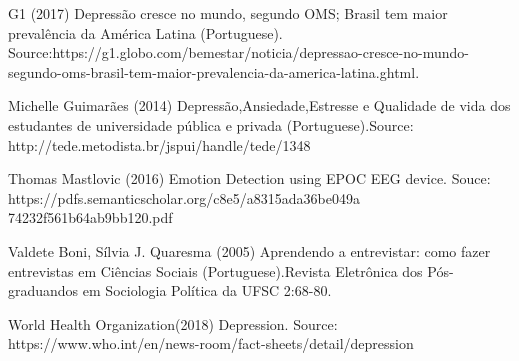 \documentclass[12pt,openright,a4paper]{article}
\begin{document}
  G1 (2017) Depressão cresce no mundo, segundo OMS; Brasil tem maior prevalência da América Latina (Portuguese). Source:https://g1.globo.com/bemestar/noticia/depressao-cresce-no-mundo-segundo-oms-brasil-tem-maior-prevalencia-da-america-latina.ghtml.\newline
  
  Michelle Guimarães (2014) Depressão,Ansiedade,Estresse e Qualidade de vida dos estudantes de universidade pública e privada (Portuguese).Source: http://tede.metodista.br/jspui/handle/tede/1348 \newline 
  
  Thomas Mastlovic (2016) Emotion Detection using EPOC EEG device. Souce: https://pdfs.semanticscholar.org/c8e5/a8315ada36be049a\\74232f561b64ab9bb120.pdf \newline
  
  Valdete Boni, Sílvia J. Quaresma (2005) Aprendendo a entrevistar: como fazer entrevistas em Ciências Sociais (Portuguese).Revista Eletrônica dos Pós-graduandos em Sociologia Política da UFSC 2:68-80.\newline
  
  World Health Organization(2018) Depression. Source: https://www.who.int/en/news-room/fact-sheets/detail/depression \newline
  
  
\end{document}

